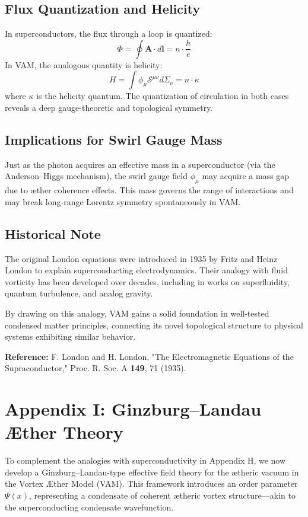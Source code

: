 \subsection{Flux Quantization and Helicity}
In superconductors, the flux through a loop is quantized:
\begin{equation}
    \Phi = \oint \mathbf{A} \cdot d\mathbf{l} = n \cdot \frac{h}{e}
\end{equation}
In VAM, the analogous quantity is helicity:
\begin{equation}
    H = \int \phi_\mu \mathcal{S}^{\mu\nu} d\Sigma_\nu = n \cdot \kappa
\end{equation}
where $\kappa$ is the helicity quantum. The quantization of circulation in both cases reveals a deep gauge-theoretic and topological symmetry.

\subsection{Implications for Swirl Gauge Mass}
Just as the photon acquires an effective mass in a superconductor (via the Anderson–Higgs mechanism), the swirl gauge field $\phi_\mu$ may acquire a mass gap due to æther coherence effects. This mass governs the range of interactions and may break long-range Lorentz symmetry spontaneously in VAM.

\subsection{Historical Note}
The original London equations were introduced in 1935 by Fritz and Heinz London to explain superconducting electrodynamics. Their analogy with fluid vorticity has been developed over decades, including in works on superfluidity, quantum turbulence, and analog gravity.

By drawing on this analogy, VAM gains a solid foundation in well-tested condensed matter principles, connecting its novel topological structure to physical systems exhibiting similar behavior.

\bigskip

\noindent \textbf{Reference:} F. London and H. London, "The Electromagnetic Equations of the Supraconductor," Proc. R. Soc. A \textbf{149}, 71 (1935).

\section{Appendix I: Ginzburg--Landau Æther Theory}
To complement the analogies with superconductivity in Appendix H, we now develop a Ginzburg--Landau-type effective field theory for the ætheric vacuum in the Vortex \AE{}ther Model (VAM). This framework introduces an order parameter $\Psi(x)$, representing a condensate of coherent ætheric vortex structure---akin to the superconducting condensate wavefunction.

